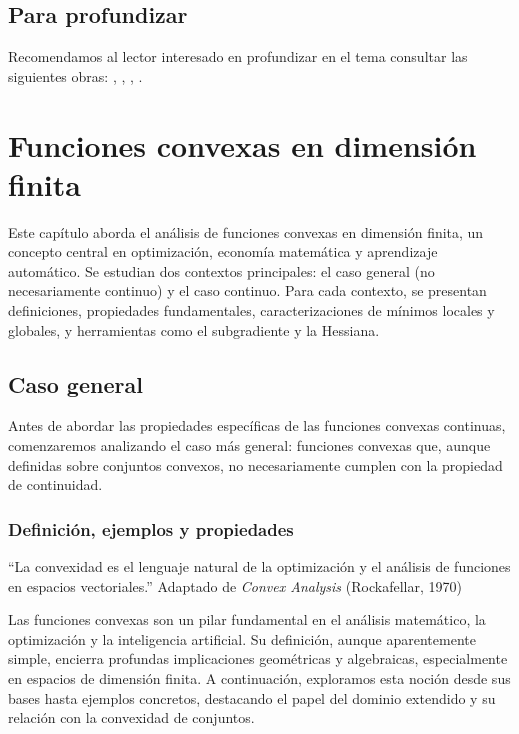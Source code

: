 \documentclass[12pt]{book}
\theoremstyle{definition}
\theoremstyle{plain}
\theoremstyle{remark}
\begin{document}

\section{Para profundizar}

Recomendamos al lector interesado en profundizar en el tema consultar las siguientes obras: 
\cite{BoydVandenberghe2004}, \cite{Grünbaum1963}, 
\cite{hiriart2001},  
\cite{Rockafellar1970}.

\chapter{Funciones convexas en dimensión finita}

Este capítulo aborda el análisis de funciones convexas en dimensión finita, un concepto central en optimización, economía matemática y aprendizaje automático. Se estudian dos contextos principales: el caso general (no necesariamente continuo) y el caso continuo. Para cada contexto, se presentan definiciones, propiedades fundamentales, caracterizaciones de mínimos locales y globales, y herramientas como el subgradiente y la Hessiana.

\section{Caso general}

Antes de abordar las propiedades específicas de las funciones convexas continuas, comenzaremos analizando el caso más general: funciones convexas que, aunque definidas sobre conjuntos convexos, no necesariamente cumplen con la propiedad de continuidad.

\subsection{
Definición, ejemplos y propiedades}
\label{subsec:funcion_convexa}

\begin{epigraph}{\small
``La convexidad es el lenguaje natural de la optimización y el análisis de funciones en espacios vectoriales.''}
{Adaptado de \textit{Convex Analysis} (Rockafellar, 1970)}
\end{epigraph}

Las funciones convexas son un pilar fundamental en el análisis matemático, la optimización y la inteligencia artificial. Su definición, aunque aparentemente simple, encierra profundas implicaciones geométricas y algebraicas, especialmente en espacios de dimensión finita. A continuación, exploramos esta noción desde sus bases hasta ejemplos concretos, destacando el papel del dominio extendido y su relación con la convexidad de conjuntos.
\end{document}
